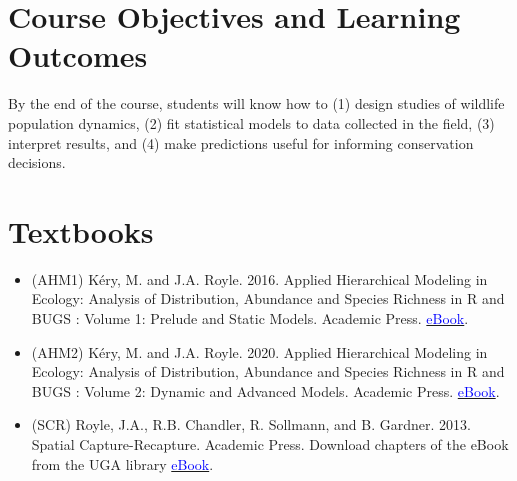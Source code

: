 \documentclass[12pt]{article}
\begin{document}
\vspace{-2mm}
\section*{\normalsize Course Objectives and Learning Outcomes}
\vspace{-4mm}
By the end of the course, students will know how to (1) design studies
of wildlife population dynamics, (2) fit statistical
models to data collected in the field, (3) interpret results, and (4)
make predictions useful for informing conservation decisions.  


\vspace{-2mm}
\section*{\normalsize Textbooks}
\vspace{-4mm}

\begin{itemize}
  \setlength\itemsep{-6pt}
  \item (AHM1) K\'ery, M. and J.A. Royle. 2016. Applied Hierarchical Modeling
    in Ecology: Analysis of Distribution, Abundance and Species Richness
    in R and BUGS : Volume 1: Prelude and Static Models. Academic Press.
    \href{https://www.sciencedirect.com/book/9780128013786/applied-hierarchical-modeling-in-ecology}{\textcolor{blue}{eBook}}.
  \item (AHM2) K\'ery, M. and J.A. Royle. 2020. Applied Hierarchical Modeling
    in Ecology: Analysis of Distribution, Abundance and Species Richness
    in R and BUGS : Volume 2: Dynamic and Advanced Models. Academic Press.
    \href{https://www.sciencedirect.com/book/9780128237687/applied-hierarchical-modeling-in-ecology-analysis-of-distribution-abundance-and-species-richness-in-r-and-bugs}{\textcolor{blue}{eBook}}.
  \item (SCR) Royle, J.A., R.B. Chandler, R. Sollmann, and
    B. Gardner. 2013. Spatial Capture-Recapture. Academic Press.
    Download chapters of the eBook from the UGA library
    \href{https://www-sciencedirect-com.proxy-remote.galib.uga.edu/book/9780124059399/spatial-capture-recapture}{\textcolor{blue}{eBook}}.
\end{itemize}

  

\vspace{-2mm}
\end{document}
